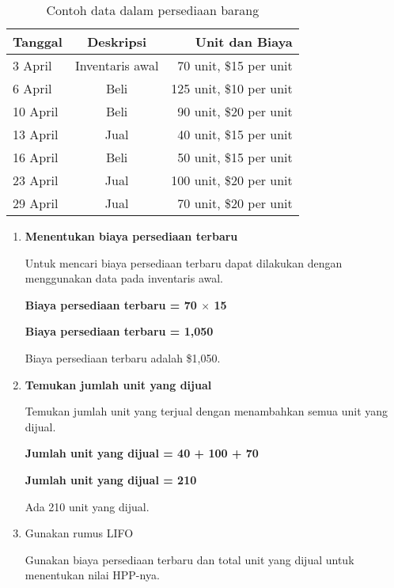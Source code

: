 \begin{enumerate}
	\begin{table}[h!]
		\begin{center}
		  \caption{Contoh data dalam persediaan barang}
		  \label{tab:table2}
		  \begin{tabular}{l|c|r} %
			\textbf{Tanggal} & \textbf{Deskripsi} & \textbf{Unit dan Biaya} \\
			\hline
			3 April & Inventaris awal & 70 unit, \${15} per unit\\
			6 April & Beli &  125 unit, \${10} per unit\\
			10 April & Beli &  90 unit, \${20} per unit\\
			13 April & Jual &  40 unit, \${15} per unit\\
			16 April & Beli &  50 unit, \${15} per unit\\
			23 April & Jual &  100 unit, \${20} per unit\\
			29 April & Jual &  70 unit, \${20} per unit\\
		  \end{tabular}
		\end{center}
	  \end{table}

	\begin{enumerate}
		\item \textbf{Menentukan biaya persediaan terbaru}
		
		Untuk mencari biaya persediaan terbaru dapat dilakukan dengan menggunakan data pada inventaris awal.

		\textbf{Biaya persediaan terbaru = 70 $\times$ 15}

		\textbf{Biaya persediaan terbaru = 1,050}

		Biaya persediaan terbaru adalah \${1,050}.

		\item \textbf{Temukan jumlah unit yang dijual}
		
		Temukan jumlah unit yang terjual dengan menambahkan semua unit yang dijual.

		\textbf{Jumlah unit yang dijual = 40 + 100 + 70}

		\textbf{Jumlah unit yang dijual = 210}

		Ada 210 unit yang dijual.

		\item Gunakan rumus LIFO
		
		Gunakan biaya persediaan terbaru dan total unit yang dijual untuk menentukan nilai HPP-nya.


\end{enumerate}
\end{enumerate}
